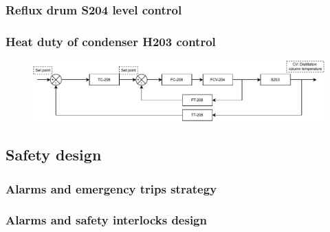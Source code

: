 \subsubsection{Reflux drum S204 level control}

\subsubsection{Heat duty of condenser H203 control}
\begin{figure}[H]
    \centering
    \includegraphics[width=\linewidth]{chapters/4-operation-control/4-Figures/S203C-TC.pdf}
    \caption{}
    \label{fig:S203C-TC}
\end{figure}


\subsubsection{}

\subsection{Safety design}

\subsubsection{Alarms and emergency trips strategy}

\subsubsection{Alarms and safety interlocks design}